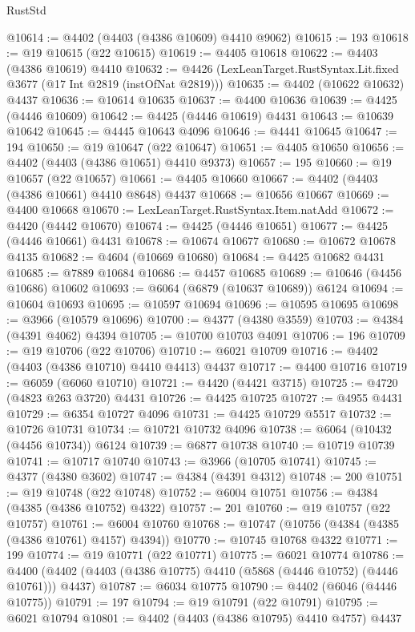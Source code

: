 \begin{lexlean}{RustStd}
\begin{coremodule}
@10614 := @4402 (@4403 (@4386 @10609) @4410 @9062)
@10615 := 193
@10618 := @19 @10615 (@22 @10615)
@10619 := @4405 @10618
@10622 := @4403 (@4386 @10619) @4410
@10632 := @4426 (LexLeanTarget.RustSyntax.Lit.fixed @3677 (@17 Int @2819 (instOfNat @2819)))
@10635 := @4402 (@10622 @10632) @4437
@10636 := @10614 @10635
@10637 := @4400 @10636
@10639 := @4425 (@4446 @10609)
@10642 := @4425 (@4446 @10619) @4431
@10643 := @10639 @10642
@10645 := @4445 @10643 @4096
@10646 := @4441 @10645
@10647 := 194
@10650 := @19 @10647 (@22 @10647)
@10651 := @4405 @10650
@10656 := @4402 (@4403 (@4386 @10651) @4410 @9373)
@10657 := 195
@10660 := @19 @10657 (@22 @10657)
@10661 := @4405 @10660
@10667 := @4402 (@4403 (@4386 @10661) @4410 @8648) @4437
@10668 := @10656 @10667
@10669 := @4400 @10668
@10670 := LexLeanTarget.RustSyntax.Item.natAdd
@10672 := @4420 (@4442 @10670)
@10674 := @4425 (@4446 @10651)
@10677 := @4425 (@4446 @10661) @4431
@10678 := @10674 @10677
@10680 := @10672 @10678 @4135
@10682 := @4604 (@10669 @10680)
@10684 := @4425 @10682 @4431
@10685 := @7889 @10684
@10686 := @4457 @10685
@10689 := @10646 (@4456 @10686) @10602
@10693 := @6064 (@6879 (@10637 @10689)) @6124
@10694 := @10604 @10693
@10695 := @10597 @10694
@10696 := @10595 @10695
@10698 := @3966 (@10579 @10696)
@10700 := @4377 (@4380 @3559)
@10703 := @4384 (@4391 @4062) @4394
@10705 := @10700 @10703 @4091
@10706 := 196
@10709 := @19 @10706 (@22 @10706)
@10710 := @6021 @10709
@10716 := @4402 (@4403 (@4386 @10710) @4410 @4413) @4437
@10717 := @4400 @10716
@10719 := @6059 (@6060 @10710)
@10721 := @4420 (@4421 @3715)
@10725 := @4720 (@4823 @263 @3720) @4431
@10726 := @4425 @10725
@10727 := @4955 @4431
@10729 := @6354 @10727 @4096
@10731 := @4425 @10729 @5517
@10732 := @10726 @10731
@10734 := @10721 @10732 @4096
@10738 := @6064 (@10432 (@4456 @10734)) @6124
@10739 := @6877 @10738
@10740 := @10719 @10739
@10741 := @10717 @10740
@10743 := @3966 (@10705 @10741)
@10745 := @4377 (@4380 @3602)
@10747 := @4384 (@4391 @4312)
@10748 := 200
@10751 := @19 @10748 (@22 @10748)
@10752 := @6004 @10751
@10756 := @4384 (@4385 (@4386 @10752) @4322)
@10757 := 201
@10760 := @19 @10757 (@22 @10757)
@10761 := @6004 @10760
@10768 := @10747 (@10756 (@4384 (@4385 (@4386 @10761) @4157) @4394))
@10770 := @10745 @10768 @4322
@10771 := 199
@10774 := @19 @10771 (@22 @10771)
@10775 := @6021 @10774
@10786 := @4400 (@4402 (@4403 (@4386 @10775) @4410 (@5868 (@4446 @10752) (@4446 @10761))) @4437)
@10787 := @6034 @10775
@10790 := @4402 (@6046 (@4446 @10775))
@10791 := 197
@10794 := @19 @10791 (@22 @10791)
@10795 := @6021 @10794
@10801 := @4402 (@4403 (@4386 @10795) @4410 @4757) @4437

\end{coremodule}
\end{lexlean}
